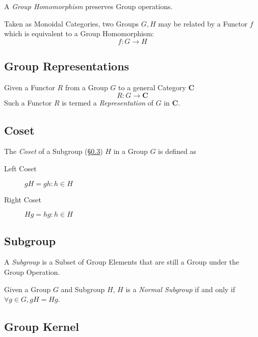 A \emph{Group Homomorphism} preserves Group operations.

Taken as Monoidal Categories, two Groups $G, H$ may be related by a
Functor $f$ which is equivalent to a Group Homomorphism:
\[
    f : G \rightarrow H
\]

\subsection{Group Representations}\label{subsec:group_representation}

Given a Functor $R$ from a Group $G$ to a general Category
$\mathbf{C}$
\[
    R : G \rightarrow \mathbf{C}
\]
Such a Functor $R$ is termed a \emph{Representation} of $G$ in
$\mathbf{C}$.

\subsection{Coset}\label{subsec:group_coset}

The \emph{Coset} of a Subgroup (\S\ref{subsec:subgroup}) $H$ in a Group $G$
is defined as
\begin{description}
\item[Left Coset] $gH = {gh : h \in H}$
\item[Right Coset] $Hg = {hg : h \in H}$
\end{description}

\subsection{Subgroup}\label{subsec:subgroup}

A \emph{Subgroup} is a Subset of Group Elements that are still a Group
under the Group Operation.

Given a Group $G$ and Subgroup $H$, $H$ is a \emph{Normal Subgroup} if
and only if $\forall g \in G, gH = Hg$.

\subsection{Group Kernel}\label{subsec:group_kernel}

